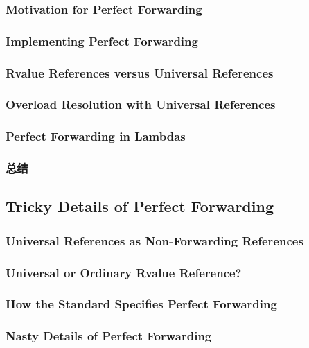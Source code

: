 \documentclass[11pt,a4paper,UTF8]{ctexart}
\begin{document}
		\subsubsection{Motivation for Perfect Forwarding}
		\subsubsection{Implementing Perfect Forwarding}
		\subsubsection{Rvalue References versus Universal References}
		\subsubsection{Overload Resolution with Universal References}
		\subsubsection{Perfect Forwarding in Lambdas}
		\subsubsection{总结}
	\subsection{Tricky Details of Perfect Forwarding}
		\subsubsection{Universal References as Non-Forwarding References}
		\subsubsection{Universal or Ordinary Rvalue Reference?}
		\subsubsection{How the Standard Specifies Perfect Forwarding}
		\subsubsection{Nasty Details of Perfect Forwarding}
\end{document}
